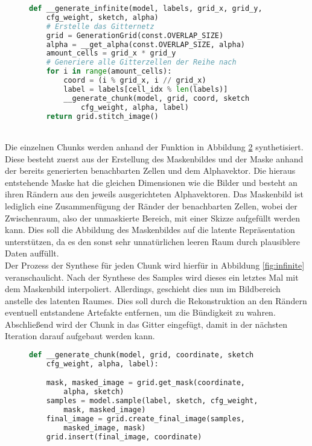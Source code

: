 \begin{figure}[htbp]
\begin{lstlisting}[language=python]
def __generate_infinite(model, labels, grid_x, grid_y,
    cfg_weight, sketch, alpha)
    # Erstelle das Gitternetz
    grid = GenerationGrid(const.OVERLAP_SIZE)
    alpha = __get_alpha(const.OVERLAP_SIZE, alpha)
    amount_cells = grid_x * grid_y
    # Generiere alle Gitterzellen der Reihe nach
    for i in range(amount_cells):
        coord = (i % grid_x, i // grid_x)
        label = labels[cell_idx % len(labels)]
        __generate_chunk(model, grid, coord, sketch
            cfg_weight, alpha, label)
    return grid.stitch_image()
\end{lstlisting}
    \captionsetup{type=figure}
    \label{fig:gen_infinite}
\end{figure} \\
Die einzelnen Chunks werden anhand der Funktion in Abbildung \ref{fig:gen_chunk} synthetisiert. Diese besteht zuerst aus der Erstellung des Maskenbildes und der Maske anhand der bereits generierten benachbarten Zellen und dem Alphavektor. Die hieraus entstehende Maske hat die gleichen Dimensionen wie die Bilder und besteht an ihren Rändern aus den jeweils ausgerichteten Alphavektoren. Das Maskenbild ist lediglich eine Zusammenfügung der Ränder der benachbarten Zellen, wobei der Zwischenraum, also der unmaskierte Bereich, mit einer Skizze aufgefüllt werden kann. Dies soll die Abbildung des Maskenbildes auf die latente Repräsentation unterstützen, da es den sonst sehr unnatürlichen leeren Raum durch plausiblere Daten auffüllt. \\
Der Prozess der Synthese für jeden Chunk wird hierfür in Abbildung \ref{fig:infinite} veranschaulicht.
Nach der Synthese des Samples wird dieses ein letztes Mal mit dem Maskenbild interpoliert. Allerdings, geschieht dies nun im Bildbereich anstelle des latenten Raumes. Dies soll durch die Rekonstruktion an den Rändern eventuell entstandene Artefakte entfernen, um die Bündigkeit zu wahren. Abschließend wird der Chunk in das Gitter eingefügt, damit in der nächsten Iteration darauf aufgebaut werden kann.
\begin{figure}[htbp]
\begin{lstlisting}[language=python]
def __generate_chunk(model, grid, coordinate, sketch
    cfg_weight, alpha, label):

    mask, masked_image = grid.get_mask(coordinate, 
        alpha, sketch)
    samples = model.sample(label, sketch, cfg_weight,
        mask, masked_image)
    final_image = grid.create_final_image(samples, 
        masked_image, mask)
    grid.insert(final_image, coordinate)
\end{lstlisting}
    \captionsetup{type=figure}
    \label{fig:gen_chunk}
\end{figure}



